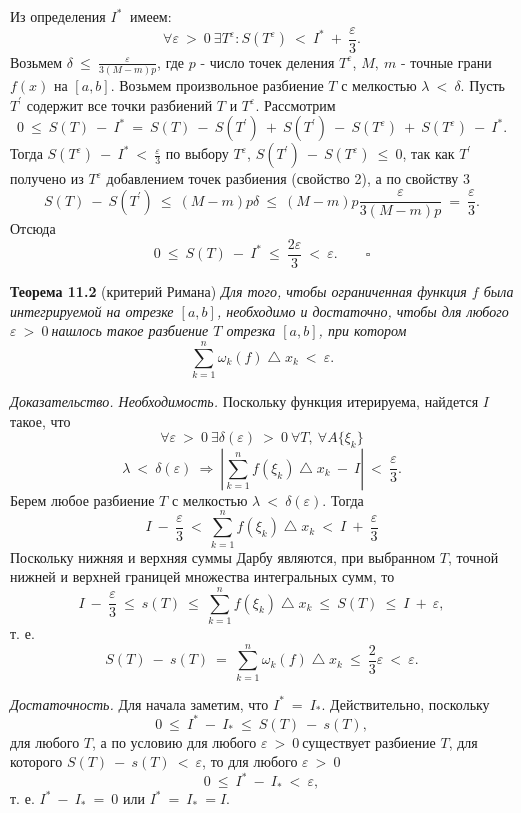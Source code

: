\documentclass[a4paper,12pt]{article}
\begin{document}
Из определения $I^*\ $ имеем:
\[\forall \varepsilon\ >\ 0\ \exists T^{\varepsilon}: S(T^{\varepsilon})\ <\ I^*\ +\ \frac{\varepsilon}{3}. \]
Возьмем $\delta\ \le\ \frac{\varepsilon}{3(M-m)p}$, где $p$ - число точек деления $T^{\varepsilon}$, $M,\ m$ - точные грани $f(x)$ на $[a, b]$. Возьмем произвольное разбиение $T$ с мелкостью $\lambda\ <\ \delta$. Пусть $T^\prime$ содержит все точки разбиений $T$ и $T^{\varepsilon}$. Рассмотрим
\[0\ \le\ S(T)\ -\ I^*\ =\ S(T)\ -\ S(T^\prime)\ +\ S(T^\prime)\ -\ S(T^\varepsilon)\ +\ S(T^\varepsilon)\ -\ I^*. \]
Тогда $S(T^{\varepsilon})\ -\ I^*\ <\ \frac{\varepsilon}{3}$ по выбору $T^{\varepsilon}$, $S(T^\prime)\ -\ S(T^{\varepsilon})\ \le\ 0$, так как $T^{\prime}$ получено из $T^{\varepsilon}$ добавлением точек разбиения (свойство 2), а по свойству 3
\[S(T)\ -\ S(T^{\prime})\ \le\ (M - m)p\delta\ \le\ (M - m)p \frac{\varepsilon}{3(M - m)p}\ =\ \frac{\varepsilon}{3}. \]
Отсюда
\[0\ \le\ S(T)\ -\ I^*\ \le\ \frac{2\varepsilon}{3}\ <\ \varepsilon. \qquad \square \]

\newpage
\textbf{Теорема 11.2} (критерий Римана)
\textit{Для того, чтобы ограниченная функция $f$ была интегрируемой на отрезке $[a, b]$, необходимо и достаточно, чтобы для любого $\varepsilon\ >\ 0\ $нашлось такое разбиение $T$ отрезка $[a, b]$, при котором}
\[\sum_{k=1}^n \omega_{k} (f) \bigtriangleup x_{k}\ <\ \varepsilon. \]

\textsf{\textit{Доказательство. Необходимость.}} Поскольку функция итерируема, найдется $I$ такое, что
\[\forall \varepsilon\ >\ 0\ \exists \delta(\varepsilon)\ >\ 0\ \forall T,\ \forall A \{\xi_{k} \} \]
\[\lambda\ <\ \delta(\varepsilon)\ \Rightarrow\ \left| \sum_{k=1}^n f(\xi_{k})\bigtriangleup x_{k}\ -\ I \right|\ <\ \frac{\varepsilon}{3}. \]
Берем любое разбиение $T$ с мелкостью $\lambda\ <\ \delta(\varepsilon)$. Тогда
\[I\ -\ \frac{\varepsilon}{3}\ <\ \sum_{k=1}^n f(\xi_{k})\bigtriangleup x_{k}\ <\ I\ +\ \frac{\varepsilon}{3} \]
Поскольку нижняя и верхняя суммы Дарбу являются, при выбранном $T$, точной нижней и верхней границей множества интегральных сумм, то 
\[I\ -\ \frac{\varepsilon}{3}\ \le\ s(T)\ \le\ \sum_{k=1}^n f(\xi_{k}) \bigtriangleup x_{k}\ \le\ S(T)\ \le\ I\ +\ \varepsilon, \]
т. е.
\[S(T)\ -\ s(T)\ =\ \sum_{k=1}^n \omega_{k} (f) \bigtriangleup x_{k}\ \le\ \frac{2}{3} \varepsilon\ <\ \varepsilon. \]

\textsf{\textit{Достаточность.}} Для начала заметим, что $I^*\ =\ I_{*}$. Действительно, поскольку
\[0\ \le\ I^*\ -\ I_{*}\ \le\ S(T)\ -\ s(T), \]
для любого $T$, а по условию для любого $\varepsilon\ >\ 0\ $существует разбиение $T$, для которого $S(T)\ -\ s(T)\ <\ \varepsilon $, то для любого $\varepsilon\ >\ 0$
\[0\ \le\ I^*\ -\ I_{*}\ <\ \varepsilon, \]
т. е. $I^*\ -\ I_{*}\ =\ 0$ или $I^*\ =\ I_{*}\ = I.$
\end{document}
